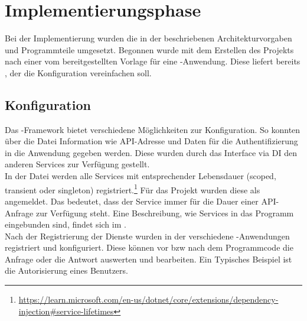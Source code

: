 \section{Implementierungsphase} 
\label{sec:Implementierungsphase}
Bei der Implementierung wurden die in der  beschriebenen Architekturvorgaben
und Programmteile umgesetzt. Begonnen wurde mit dem Erstellen des Projekts nach einer vom 
bereitgestellten Vorlage für eine -Anwendung. Diese liefert bereits ,
der \zB die Konfiguration vereinfachen soll.

\subsection{Konfiguration}
\label{sec:Konfiguration}
Das -Framework bietet verschiedene Möglichkeiten zur Konfiguration.
So konnten über die Datei  Information wie \acs{API}-Adresse und Daten für die
Authentifizierung in die Anwendung gegeben werden. Diese wurden durch das Interface 
via \acs{DI} den anderen Services zur Verfügung gestellt. \\
In der Datei  werden alle Services mit entsprechender Lebensdauer (scoped, transient oder singleton)
registriert.\footnote{\url{https://learn.microsoft.com/en-us/dotnet/core/extensions/dependency-injection\#service-lifetimes}}
Für das Projekt wurden diese als  angemeldet. Das bedeutet, dass der Service immer für die Dauer einer
\acs{API}-Anfrage zur Verfügung steht. Eine Beschreibung, wie Services in das Programm eingebunden sind, findet sich im 
.\\
Nach der Registrierung der Dienste wurden in der  verschiedene -Anwendungen 
registriert und konfiguriert. Diese können vor \acs{bzw} nach dem Programmcode die Anfrage oder die Antwort auswerten 
und bearbeiten. Ein Typisches Beispiel ist die Autorisierung eines Benutzers.

